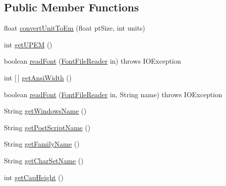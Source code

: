 \subsection*{Public Member Functions}
\begin{DoxyCompactItemize}
\item 
float \mbox{\hyperlink{classorg_1_1newdawn_1_1slick_1_1tools_1_1hiero_1_1truetype_1_1_t_t_f_file_a5b7dc3f8666eb78401b946e467cd2ba8}{convert\+Unit\+To\+Em}} (float pt\+Size, int units)
\item 
int \mbox{\hyperlink{classorg_1_1newdawn_1_1slick_1_1tools_1_1hiero_1_1truetype_1_1_t_t_f_file_a4ad1b8a157abb894e10a2ddf96270c3e}{get\+U\+P\+EM}} ()
\item 
boolean \mbox{\hyperlink{classorg_1_1newdawn_1_1slick_1_1tools_1_1hiero_1_1truetype_1_1_t_t_f_file_a8130f3772fac304168fdf64d6f26dfbe}{read\+Font}} (\mbox{\hyperlink{classorg_1_1newdawn_1_1slick_1_1tools_1_1hiero_1_1truetype_1_1_font_file_reader}{Font\+File\+Reader}} in)  throws I\+O\+Exception 
\item 
int \mbox{[}$\,$\mbox{]} \mbox{\hyperlink{classorg_1_1newdawn_1_1slick_1_1tools_1_1hiero_1_1truetype_1_1_t_t_f_file_a348ceea251dc936b59367bb05f1127c7}{get\+Ansi\+Width}} ()
\item 
boolean \mbox{\hyperlink{classorg_1_1newdawn_1_1slick_1_1tools_1_1hiero_1_1truetype_1_1_t_t_f_file_a456dfa68ed9b779aa147e1ead99bb8b9}{read\+Font}} (\mbox{\hyperlink{classorg_1_1newdawn_1_1slick_1_1tools_1_1hiero_1_1truetype_1_1_font_file_reader}{Font\+File\+Reader}} in, String name)  throws I\+O\+Exception 
\item 
String \mbox{\hyperlink{classorg_1_1newdawn_1_1slick_1_1tools_1_1hiero_1_1truetype_1_1_t_t_f_file_a1a4c322aa67c0b7be8b13cb20eb57e19}{get\+Windows\+Name}} ()
\item 
String \mbox{\hyperlink{classorg_1_1newdawn_1_1slick_1_1tools_1_1hiero_1_1truetype_1_1_t_t_f_file_afa836060c935521d9d9073eba9f38a4d}{get\+Post\+Script\+Name}} ()
\item 
String \mbox{\hyperlink{classorg_1_1newdawn_1_1slick_1_1tools_1_1hiero_1_1truetype_1_1_t_t_f_file_a2b4dc4a9e27d6fa60fb7305d8ee43912}{get\+Family\+Name}} ()
\item 
String \mbox{\hyperlink{classorg_1_1newdawn_1_1slick_1_1tools_1_1hiero_1_1truetype_1_1_t_t_f_file_a886455e0575d902c5c7d7bc9bb35f965}{get\+Char\+Set\+Name}} ()
\item 
int \mbox{\hyperlink{classorg_1_1newdawn_1_1slick_1_1tools_1_1hiero_1_1truetype_1_1_t_t_f_file_ad9331a67970b6f5589c37ba9b3206939}{get\+Cap\+Height}} ()

\end{DoxyCompactItemize}

